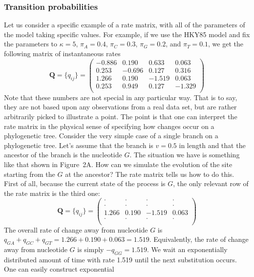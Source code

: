 \documentclass{svmult}
\begin{document}
\subsubsection{Transition probabilities} Let us consider a specific example of a rate matrix, with all of the parameters of the model taking
specific values. For example, if we use the HKY85 model and fix the parameters to 
$\kappa = 5$, $\pi_A = 0.4$, $\pi_C = 0.3$, $\pi_G = 0.2$, and $\pi_T = 0.1$, we get the following matrix of instantaneous
rates
$$
{\mathbf Q} = \{q_{ij}\} = \left( \begin{array}{rrrr}
-0.886 &  0.190 &  0.633 &  0.063 \\
 0.253 & -0.696 &  0.127 &  0.316 \\
 1.266 &  0.190 & -1.519 &  0.063 \\
 0.253 &  0.949 &  0.127 & -1.329 \\
\end{array} \right)
$$
Note that these numbers are not special in any particular way. That is to say, they are not based upon any observations
from a real data set, but are rather arbitrarily picked to illustrate a point. The point is that one can interpret the rate matrix
in the physical sense of specifying how changes occur on a phylogenetic tree. Consider the very simple case of a single
branch on a phylogenetic tree. Let's assume that the branch is $v=0.5$ in length and that the ancestor of the branch is
the nucleotide $G$. The situation we have is something like that shown in Figure~2A. How can we simulate the evolution
of the site starting from the $G$ at the ancestor? The rate matrix tells us how to do this. First of all, because the current state of the process is $G$,  the only relevant row of the rate matrix is the third one:
$$
{\mathbf Q} = \{q_{ij}\} = \left( \begin{array}{cccc}
\cdot   &   \cdot &    \cdot &  \cdot \\
\cdot   &   \cdot &    \cdot &  \cdot \\
1.266 &  0.190 & -1.519 &  0.063 \\
\cdot   &   \cdot &    \cdot & \cdot \\
\end{array} \right)
$$
The overall rate of change away from nucleotide $G$ is $q_{GA} + q_{GC} + q_{GT} = 1.266 + 0.190 + 0.063 = 1.519$.
Equivalently, the rate of change away from nucleotide $G$ is simply $-q_{GG} = 1.519$. We wait an exponentially
distributed amount of time with rate 1.519 until the next substitution occurs. One can easily construct exponential
\end{document}
